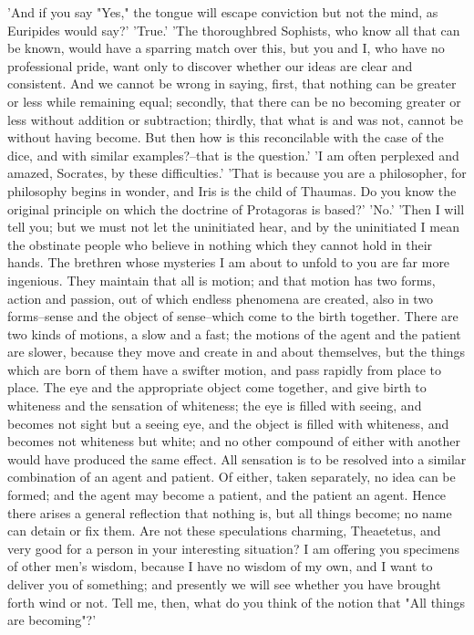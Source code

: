 'And if you say "Yes," the tongue will escape conviction but not the
mind, as Euripides would say?' 'True.' 'The thoroughbred Sophists, who
know all that can be known, would have a sparring match over this, but
you and I, who have no professional pride, want only to discover whether
our ideas are clear and consistent. And we cannot be wrong in saying,
first, that nothing can be greater or less while remaining equal;
secondly, that there can be no becoming greater or less without addition
or subtraction; thirdly, that what is and was not, cannot be without
having become. But then how is this reconcilable with the case of the
dice, and with similar examples?--that is the question.' 'I am often
perplexed and amazed, Socrates, by these difficulties.' 'That is because
you are a philosopher, for philosophy begins in wonder, and Iris is
the child of Thaumas. Do you know the original principle on which the
doctrine of Protagoras is based?' 'No.' 'Then I will tell you; but we
must not let the uninitiated hear, and by the uninitiated I mean the
obstinate people who believe in nothing which they cannot hold in their
hands. The brethren whose mysteries I am about to unfold to you are far
more ingenious. They maintain that all is motion; and that motion
has two forms, action and passion, out of which endless phenomena are
created, also in two forms--sense and the object of sense--which come to
the birth together. There are two kinds of motions, a slow and a fast;
the motions of the agent and the patient are slower, because they move
and create in and about themselves, but the things which are born of
them have a swifter motion, and pass rapidly from place to place.
The eye and the appropriate object come together, and give birth to
whiteness and the sensation of whiteness; the eye is filled with seeing,
and becomes not sight but a seeing eye, and the object is filled with
whiteness, and becomes not whiteness but white; and no other compound of
either with another would have produced the same effect. All sensation
is to be resolved into a similar combination of an agent and patient.
Of either, taken separately, no idea can be formed; and the agent may
become a patient, and the patient an agent. Hence there arises a general
reflection that nothing is, but all things become; no name can detain or
fix them. Are not these speculations charming, Theaetetus, and very good
for a person in your interesting situation? I am offering you specimens
of other men's wisdom, because I have no wisdom of my own, and I want
to deliver you of something; and presently we will see whether you
have brought forth wind or not. Tell me, then, what do you think of the
notion that "All things are becoming"?'

